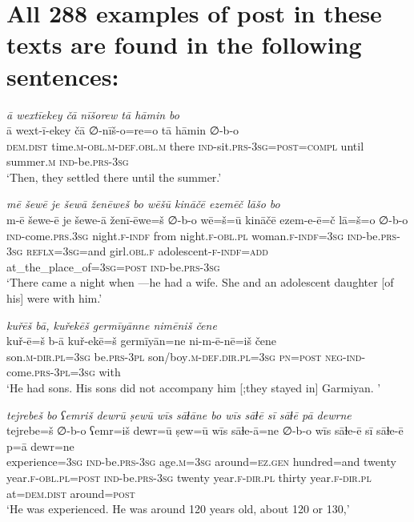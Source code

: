 \chapter{All 288 examples of post in these texts are found in the following sentences:}

\ea \label{ZB.6}
\textit{ā wextīekey čā nīšorew tā hāmin bo} \\ 
\gll ā wext-ī-ekey čā ∅-nīš-o=re=o tā hāmin ∅-b-o \\ 
 \textsc{dem.dist} time\textsc{.m}\textsc{-obl}\textsc{.m}\textsc{-def}\textsc{.obl}\textsc{.m} there \textsc{ind-}sit\textsc{.prs}\textsc{-3sg}\textsc{=\textsc{post}}\textsc{=compl} until summer\textsc{.m} \textsc{ind-}be\textsc{.prs}\textsc{-3sg} \\ 
\glt `Then, they settled there until the summer.'
\z 
 
\ea \label{ZB.8}
\textit{mē šewē je šewā ženēweš bo wēšū kināčē ezemēč lāšo bo} \\ 
\gll m-ē šewe-ē je šewe-ā ženī-ēwe=š ∅-b-o wē=š=ū kināčē ezem-e-ē=č lā=š=o ∅-b-o \\ 
 \textsc{ind-}come\textsc{.prs}\textsc{.3sg} night\textsc{.f}\textsc{-indf} from night\textsc{.f}\textsc{-obl}\textsc{.pl} woman\textsc{.f}\textsc{-indf}\textsc{=3sg} \textsc{ind-}be\textsc{.prs}\textsc{-3sg} \textsc{reflx}\textsc{=3sg}=and girl\textsc{.obl}\textsc{.f} adolescent\textsc{-f}\textsc{-indf}\textsc{=add} at\_the\_place\_of\textsc{=3sg}\textsc{=\textsc{post}} \textsc{ind-}be\textsc{.prs}\textsc{-3sg} \\ 
\glt `There came a night when —he had a wife. She and an adolescent daughter [of his] were with him.'
\z 
 
\ea \label{ZB.9}
\textit{kuřēš bā, kuřekēš germīyānne nimēniš čene} \\ 
\gll kuř-ē=š b-ā kuř-ekē=š germīyān=ne ni-m-ē-nē=iš čene \\ 
 son\textsc{.m}\textsc{-dir}\textsc{.pl}\textsc{=3sg} be\textsc{.prs}\textsc{-3pl} son/boy\textsc{.m}\textsc{-def}\textsc{.dir}\textsc{.pl}\textsc{=3sg} \textsc{pn}\textsc{=\textsc{post}} \textsc{neg-}\textsc{ind-}come\textsc{.prs}\textsc{-3pl}\textsc{=3sg} with \\ 
\glt `He had sons. His sons did not accompany him [;they stayed in] Garmiyan. '
\z 
 
\ea \label{ZB.12}
\textit{tejrebeš bo ʕemriš dewrū ṣewū wīs sāɫāne bo wīs sāɫē sī sāɫē pā dewrne} \\ 
\gll tejrebe=š ∅-b-o ʕemr=iš dewr=ū ṣew=ū wīs sāɫe-ā=ne ∅-b-o wīs sāɫe-ē sī sāɫe-ē p=ā dewr=ne \\ 
 experience\textsc{=3sg} \textsc{ind-}be\textsc{.prs}\textsc{-3sg} age\textsc{.m}\textsc{=3sg} around\textsc{\textsc{=ez.gen}} hundred=and twenty year\textsc{.f}\textsc{-obl}\textsc{.pl}\textsc{=\textsc{post}} \textsc{ind-}be\textsc{.prs}\textsc{-3sg} twenty year\textsc{.f}\textsc{-dir}\textsc{.pl} thirty year\textsc{.f}\textsc{-dir}\textsc{.pl} at=\textsc{dem.dist} around\textsc{=\textsc{post}} \\ 
\glt `He was experienced. He was around 120 years old, about 120 or 130,'
\z 
 
